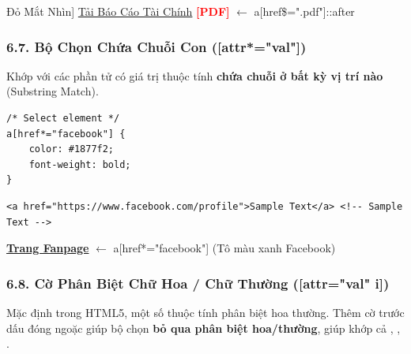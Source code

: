 \begin{browserWindow}[Kết Quả Hiển Thị: Tự Động Chèn Nhãn [PDF] Đỏ Mắt Nhìn]
\sffamily\small
\textcolor{primaryBlue}{\underline{Tải Báo Cáo Tài Chính}} \textcolor{red}{\textbf{[PDF]}} \textcolor{gray!60}{\scriptsize $\leftarrow$ a[href\$=".pdf"]::after}
\end{browserWindow}

\subsubsection{6.7. Bộ Chọn Chứa Chuỗi Con ([attr*="val"])}

\begin{conceptBox}
Khớp với các phần tử có giá trị thuộc tính \textbf{chứa chuỗi  ở bất kỳ vị trí nào} (Substring Match).
\end{conceptBox}

\begin{codeWindow}
\begin{lstlisting}[language=CSS3]
/* Select element */
a[href*="facebook"] {
    color: #1877f2;
    font-weight: bold;
}
\end{lstlisting}

\begin{lstlisting}[language=HTML5]
<a href="https://www.facebook.com/profile">Sample Text</a> <!-- Sample Text -->
\end{lstlisting}
\end{codeWindow}

\begin{browserWindow}
\sffamily\small
\textcolor{primaryBlue}{\textbf{\underline{Trang Fanpage}}} \textcolor{gray!60}{\scriptsize $\leftarrow$ a[href*="facebook"] (Tô màu xanh Facebook)}
\end{browserWindow}

\subsubsection{6.8. Cờ Phân Biệt Chữ Hoa / Chữ Thường ([attr="val" i])}

\begin{conceptBox}
Mặc định trong HTML5, một số thuộc tính phân biệt hoa thường. Thêm cờ  trước dấu đóng ngoặc \codeinline{]} giúp bộ chọn \textbf{bỏ qua phân biệt hoa/thường}, giúp khớp cả , , .
\end{conceptBox}

